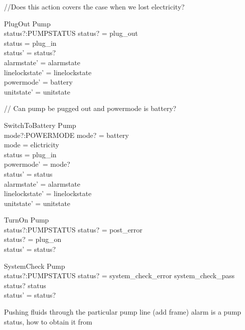 \documentclass{article}
\begin{document}
	//Does this action covers the case when we lost electricity?
	
	\begin{schema}{PlugOut}
		\Delta Pump\\
		status?:PUMPSTATUS
	\where
		status? = plug\_out \\
		status = plug\_in \\
		status' = status? \\
		alarmstate' = alarmstate \\
		linelockstate' = linelockstate \\
		powermode' =  battery \\
		unitstate' = unitstate \\
	\end{schema}
	
	// Can pump be pugged out and powermode is battery?	
	
	\begin{schema}{SwitchToBattery}
		\Delta Pump\\
		mode?:POWERMODE
	\where 
		mode? = battery \\
		mode = elictricity \\
		status = plug\_in \\
		powermode' = mode? \\
		status' = status \\
		alarmstate' = alarmstate \\
		linelockstate' = linelockstate \\
		unitstate' = unitstate \\
	\end{schema}
	
	\begin{schema}{TurnOn}
		\Delta Pump \\
		status?:PUMPSTATUS
	\where 
		status? = post\_error  \\
		status? = plug\_on \\
		status' = status?
	\end{schema}
			
	\begin{schema}{SystemCheck}
		\Delta Pump\\
		status?:PUMPSTATUS
	\where 
		status? = system\_check\_error \lor system\_check\_pass \\
		status? \neq status\\
		status' = status?
	\end{schema}
	
	Pushing fluids through the particular pump line (add frame) alarm is a pump status, how to obtain it from
	
\end{document}
